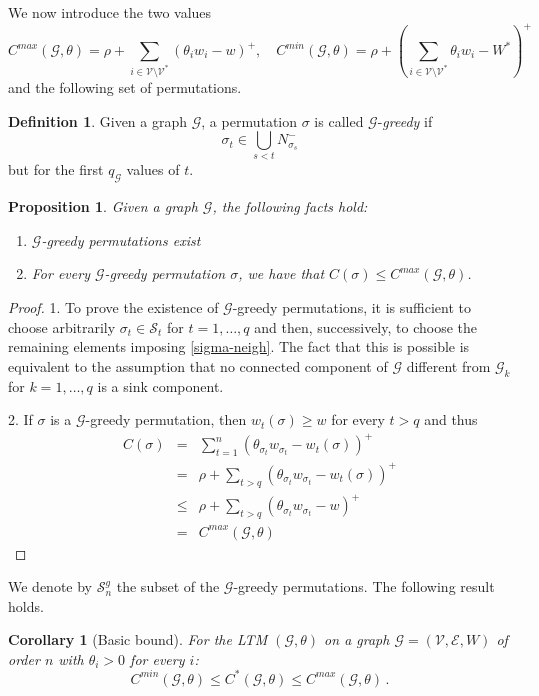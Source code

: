 \documentclass[12pt,twoside,reqno]{amsart}
\newtheorem{proposition}[theorem]{Proposition}
\newtheorem{corollary}[theorem]{Corollary}
\theoremstyle{definition}
\newtheorem{definition}[theorem]{Definition}
\numberwithin{equation}{section}
\newcommand{\be}{\begin{equation}}
\newcommand{\ee}{\end{equation}}
\newcommand{\mc}{\mathcal}
\newcommand{\0}{\mathbf{0}}
\newcommand{\1}{\mathbf{1}}
\newcommand{\thre}{\theta}
\newcommand{\threabs}{\theta}
\newcommand{\we}{W^*}
\begin{document}
{We now introduce the two values
\be\label{indices} C^{max}(\mc G,\threabs)=\rho+\sum\limits_{i\in\mc V\setminus\mc V^*}(\thre_iw_i-w)^+, \quad C^{min}(\mc G,\threabs)=\rho+\left(\sum\limits_{i\in\mc V\setminus \mc V^*}\threabs_iw_i-\we\right)^+\ee
and the following set of permutations.
\begin{definition} Given a graph $\mc G$, a permutation $\sigma$ is called $\mc G$-\emph{greedy} if 
\be\label{sigma-neigh}  \sigma_t\in\bigcup\limits_{s<t}N^-_{\sigma_s}\ee
but for the first $q_{\mc G}$ values of $t$.
\end{definition}
\begin{proposition} Given a graph $\mc G$, the following facts hold:
\begin{enumerate}
\item $\mc G$-{greedy} permutations exist
\item For every $\mc G$-{greedy} permutation $\sigma$, we have that $C(\sigma)\leq C^{max}(\mc G,\threabs)$.
\end{enumerate}
\end{proposition}
\begin{proof}
1. To prove the existence of $\mc G$-{greedy} permutations, it is sufficient to choose arbitrarily $\sigma_t\in\mc S_t$ for $t=1,\dots , q$ and then, successively, to choose the remaining elements imposing \eqref{sigma-neigh}. The fact that this is possible  is equivalent to the assumption that no connected component of $\mc G$ different from $\mc G_k$ for $k=1,\dots ,q$ is a sink component. 

2. If $\sigma$ is a $\mc G$-{greedy} permutation, then $w_t(\sigma)\geq w$ for every $t>q$ and thus
$$\begin{array}{rcl}C(\sigma)&=&\sum\limits_{t=1}^n(\thre_{\sigma_t}w_{\sigma_t}-w_t(\sigma))^+\\&=&\rho+\sum\limits_{t> q}(\thre_{\sigma_t}w_{\sigma_t}-w_t(\sigma))^+\\
&\leq &\rho+\sum\limits_{t>q}(\thre_{\sigma_t}w_{\sigma_t}-w)^+\\ &=&C^{max}(\mc G,\threabs)\end{array}$$
\end{proof}







We denote by $\mc S_n^g$ the subset of the $\mc G$-greedy permutations.
The following result holds.
\begin{corollary}[Basic bound] 
\label{cor:conservation} For the LTM $(\mc G,\threabs)$ on a graph $\mc G=(\mc V, \mc E, W)$ of order $n$ with $\thre_i>0$ for every $i$: 
\be\label{basic-bound}C^{min}(\mc G,\threabs)\leq C^*(\mc G, \threabs)\leq C^{max}(\mc G,\threabs)\,.\ee
\end{corollary}
 
}
\end{document}
